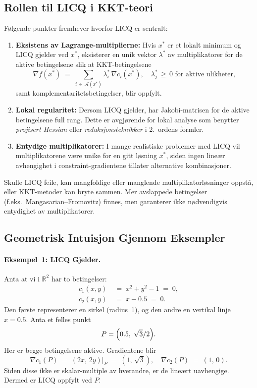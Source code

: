 \subsection{Rollen til LICQ i KKT-teori}

Følgende punkter fremhever hvorfor LICQ er sentralt:
\begin{enumerate}
\item \textbf{Eksistens av Lagrange-multiplierne:} Hvis \(x^*\) er et lokalt minimum og LICQ gjelder ved \(x^*\), eksisterer en unik vektor \(\lambda^*\) av multiplikatorer for de aktive betingelsene slik at KKT-betingelsene 
\[
\nabla f(x^*) \;=\; \sum_{i \,\in\, \mathcal{A}(x^*)}\!\lambda_i^*\,\nabla c_i(x^*),\quad
\lambda_j^* \,\ge\,0 \text{ for aktive ulikheter},
\]
samt komplementaritetsbetingelser, blir oppfylt.
\item \textbf{Lokal regularitet:} Dersom LICQ gjelder, har Jakobi-matrisen for de aktive betingelsene full rang. Dette er avgjørende for lokal analyse som benytter \emph{projisert Hessian} eller \emph{reduksjonsteknikker} i 2.~ordens formler.
\item \textbf{Entydige multiplikatorer:} I mange realistiske problemer med LICQ vil multiplikatorene være unike for en gitt løsning \(x^*\), siden ingen lineær avhengighet i constraint-gradientene tillater alternative kombinasjoner.
\end{enumerate}
Skulle LICQ feile, kan mangfoldige eller manglende multiplikatorløsninger oppstå, eller KKT-metoder kan bryte sammen. Mer avslappede betingelser (f.eks.\ Mangasarian--Fromovitz) finnes, men garanterer ikke nødvendigvis entydighet av multiplikatorer.

\subsection{Geometrisk Intuisjon Gjennom Eksempler}

\paragraph{Eksempel~1: LICQ Gjelder.}

Anta at vi i \(\mathbb{R}^2\) har to betingelser:
\[
\begin{aligned}
c_1(x,y)\;&=\; x^2 + y^2 - 1\;=\;0,\\
c_2(x,y)\;&=\; x - 0.5\;=\;0.
\end{aligned}
\]
Den første representerer en sirkel (radius~1), og den andre en vertikal linje \(x=0.5\). Anta et felles punkt 
\[
P = \Bigl(0.5,\;\sqrt{3}/2\Bigr).
\]
Her er begge betingelsene aktive. Gradientene blir 
\[
\nabla c_1(P)\;=\;(2x,\,2y)\big\vert_{P}\;=\;(1,\,\sqrt{3}),
\quad
\nabla c_2(P)\;=\;(1,\,0).
\]
Siden disse ikke er skalar-multiple av hverandre, er de lineært uavhengige. Dermed er LICQ oppfylt ved \(P\).

